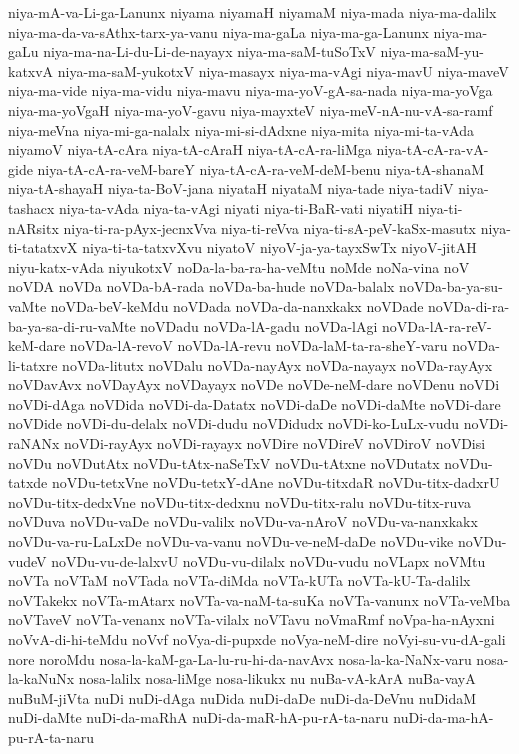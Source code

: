 {niya-mA-va-Li-ga-Lanunx
niyama
niyamaH
niyamaM
niya-mada
niya-ma-dalilx
niya-ma-da-va-sAthx-tarx-ya-vanu
niya-ma-gaLa
niya-ma-ga-Lanunx
niya-ma-gaLu
niya-ma-na-Li-du-Li-de-nayayx
niya-ma-saM-tuSoTxV
niya-ma-saM-yu-katxvA
niya-ma-saM-yukotxV
niya-masayx
niya-ma-vAgi
niya-mavU
niya-maveV
niya-ma-vide
niya-ma-vidu
niya-mavu
niya-ma-yoV-gA-sa-nada
niya-ma-yoVga
niya-ma-yoVgaH
niya-ma-yoV-gavu
niya-mayxteV
niya-meV-nA-nu-vA-sa-ramf
niya-meVna
niya-mi-ga-nalalx
niya-mi-si-dAdxne
niya-mita
niya-mi-ta-vAda
niyamoV
niya-tA-cAra
niya-tA-cAraH
niya-tA-cA-ra-liMga
niya-tA-cA-ra-vA-gide
niya-tA-cA-ra-veM-bareY
niya-tA-cA-ra-veM-deM-benu
niya-tA-shanaM
niya-tA-shayaH
niya-ta-BoV-jana
niyataH
niyataM
niya-tade
niya-tadiV
niya-tashacx
niya-ta-vAda
niya-ta-vAgi
niyati
niya-ti-BaR-vati
niyatiH
niya-ti-nARsitx
niya-ti-ra-pAyx-jecnxVva
niya-ti-reVva
niya-ti-sA-peV-kaSx-masutx
niya-ti-tatatxvX
niya-ti-ta-tatxvXvu
niyatoV
niyoV-ja-ya-tayxSwTx
niyoV-jitAH
niyu-katx-vAda
niyukotxV
noDa-la-ba-ra-ha-veMtu
noMde
noNa-vina
noV
noVDA
noVDa
noVDa-bA-rada
noVDa-ba-hude
noVDa-balalx
noVDa-ba-ya-su-vaMte
noVDa-beV-keMdu
noVDada
noVDa-da-nanxkakx
noVDade
noVDa-di-ra-ba-ya-sa-di-ru-vaMte
noVDadu
noVDa-lA-gadu
noVDa-lAgi
noVDa-lA-ra-reV-keM-dare
noVDa-lA-revoV
noVDa-lA-revu
noVDa-laM-ta-ra-sheY-varu
noVDa-li-tatxre
noVDa-litutx
noVDalu
noVDa-nayAyx
noVDa-nayayx
noVDa-rayAyx
noVDavAvx
noVDayAyx
noVDayayx
noVDe
noVDe-neM-dare
noVDenu
noVDi
noVDi-dAga
noVDida
noVDi-da-Datatx
noVDi-daDe
noVDi-daMte
noVDi-dare
noVDide
noVDi-du-delalx
noVDi-dudu
noVDidudx
noVDi-ko-LuLx-vudu
noVDi-raNANx
noVDi-rayAyx
noVDi-rayayx
noVDire
noVDireV
noVDiroV
noVDisi
noVDu
noVDutAtx
noVDu-tAtx-naSeTxV
noVDu-tAtxne
noVDutatx
noVDu-tatxde
noVDu-tetxVne
noVDu-tetxY-dAne
noVDu-titxdaR
noVDu-titx-dadxrU
noVDu-titx-dedxVne
noVDu-titx-dedxnu
noVDu-titx-ralu
noVDu-titx-ruva
noVDuva
noVDu-vaDe
noVDu-valilx
noVDu-va-nAroV
noVDu-va-nanxkakx
noVDu-va-ru-LaLxDe
noVDu-va-vanu
noVDu-ve-neM-daDe
noVDu-vike
noVDu-vudeV
noVDu-vu-de-lalxvU
noVDu-vu-dilalx
noVDu-vudu
noVLapx
noVMtu
noVTa
noVTaM
noVTada
noVTa-diMda
noVTa-kUTa
noVTa-kU-Ta-dalilx
noVTakekx
noVTa-mAtarx
noVTa-va-naM-ta-suKa
noVTa-vanunx
noVTa-veMba
noVTaveV
noVTa-venanx
noVTa-vilalx
noVTavu
noVmaRmf
noVpa-ha-nAyxni
noVvA-di-hi-teMdu
noVvf
noVya-di-pupxde
noVya-neM-dire
noVyi-su-vu-dA-gali
nore
noroMdu
nosa-la-kaM-ga-La-lu-ru-hi-da-navAvx
nosa-la-ka-NaNx-varu
nosa-la-kaNuNx
nosa-lalilx
nosa-liMge
nosa-likukx
nu
nuBa-vA-kArA
nuBa-vayA
nuBuM-jiVta
nuDi
nuDi-dAga
nuDida
nuDi-daDe
nuDi-da-DeVnu
nuDidaM
nuDi-daMte
nuDi-da-maRhA
nuDi-da-maR-hA-pu-rA-ta-naru
nuDi-da-ma-hA-pu-rA-ta-naru
}
